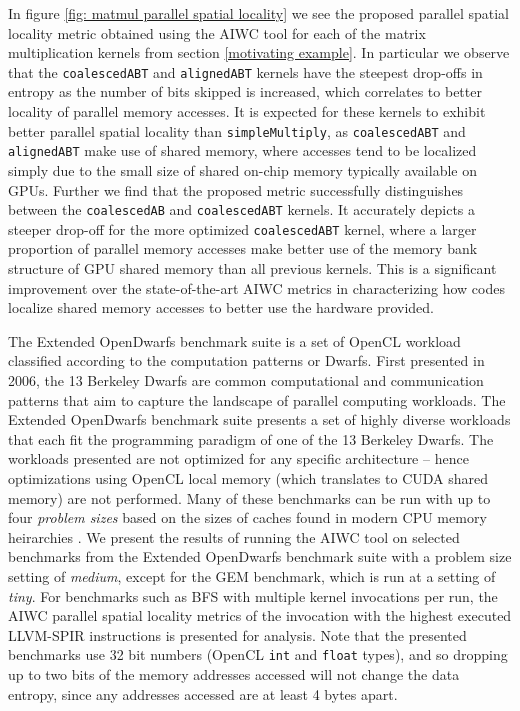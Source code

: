 \documentclass[review=false, sigchi]{acmart}
\begin{document}
	In figure \ref{fig: matmul parallel spatial locality} we see the proposed parallel spatial locality metric obtained using the AIWC tool for each of the matrix multiplication kernels from section \ref{motivating example}. In particular we observe that the \texttt{coalescedABT} and \texttt{alignedABT} kernels have the steepest drop-offs in entropy as the number of bits skipped is increased, which correlates to better locality of parallel memory accesses. It is expected for these kernels to exhibit better parallel spatial locality than \texttt{simpleMultiply}, as \texttt{coalescedABT} and \texttt{alignedABT} make use of shared memory, where accesses tend to be localized simply due to the small size of shared on-chip memory typically available on GPUs. Further we find that the proposed metric successfully distinguishes between the \texttt{coalescedAB} and \texttt{coalescedABT} kernels. It accurately depicts a steeper drop-off for the more optimized \texttt{coalescedABT} kernel, where a larger proportion of parallel memory accesses make better use of the memory bank structure of GPU shared memory than all previous kernels. This is a significant improvement over the state-of-the-art AIWC metrics in characterizing how codes localize shared memory accesses to better use the hardware provided.
	
	The Extended OpenDwarfs benchmark suite is a set of OpenCL workload classified according to the computation patterns or Dwarfs. 
	First presented in 2006, the 13 Berkeley Dwarfs are common computational and communication patterns that aim to capture the landscape of parallel computing workloads. 
	The Extended OpenDwarfs benchmark suite presents a set of highly diverse workloads that each fit the programming paradigm of one of the 13 Berkeley Dwarfs.
	The workloads presented are not optimized for any specific architecture -- hence optimizations using OpenCL local memory (which translates to CUDA shared memory) are not performed. 
	Many of these benchmarks can be run with up to four \emph{problem sizes} based on the sizes of caches found in modern CPU memory heirarchies \cite{johnston18opendwarfs}.
	We present the results of running the AIWC tool on selected benchmarks from the Extended OpenDwarfs benchmark suite \cite{opendwarfs2020head,johnston18opendwarfs} with a problem size setting of \emph{medium}, except for the GEM benchmark, which is run at a setting of \emph{tiny}.
	For benchmarks such as BFS with multiple kernel invocations per run, the AIWC parallel spatial locality metrics of the invocation with the highest executed LLVM-SPIR instructions is presented for analysis. Note that the presented benchmarks use 32 bit numbers (OpenCL \texttt{int} and \texttt{float} types), and so dropping up to two bits of the memory addresses accessed will not change the data entropy, since any addresses accessed are at least 4 bytes apart.
	
\end{document}

